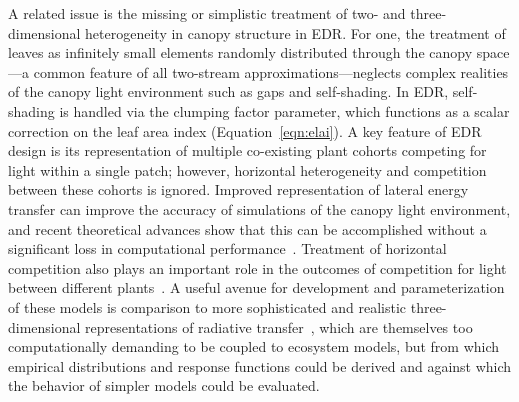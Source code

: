 A related issue is the missing or simplistic treatment of two- and three-dimensional heterogeneity in canopy structure in EDR.\@
For one, the treatment of leaves as infinitely small elements randomly distributed through the canopy space---a common feature of all two-stream approximations---neglects complex realities of the canopy light environment such as gaps and self-shading.
In EDR, self-shading is handled via the clumping factor parameter, which functions as a scalar correction on the leaf area index (Equation~\ref{eqn:elai}).
A key feature of EDR design is its representation of multiple co-existing plant cohorts competing for light within a single patch;
however, horizontal heterogeneity and competition between these cohorts is ignored.
Improved representation of lateral energy transfer can improve the accuracy of simulations of the canopy light environment, and recent theoretical advances show that this can be accomplished without a significant loss in computational performance~\citep{hogan_2018_fast}.
Treatment of horizontal competition also plays an important role in the outcomes of competition for light between different plants~\citep{fisher2018vegetation}.
A useful avenue for development and parameterization of these models is comparison to more sophisticated and realistic three-dimensional representations of radiative transfer~\citep[e.g.][]{widlowski2007third}, which are themselves too computationally demanding to be coupled to ecosystem models, but from which empirical distributions and response functions could be derived and against which the behavior of simpler models could be evaluated.
